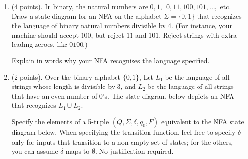 \documentclass[letterpaper,11pt,twoside]{article}
\theoremstyle{plain}
\theoremstyle{definition}
\theoremstyle{remark}
\theoremstyle{restate}
\begin{document}
\begin{enumerate}
    \item (4 points). 
    In binary, the natural numbers are $0, 1, 10, 11, 100, 101, ..., $ etc. Draw a state diagram for an NFA on the alphabet $\Sigma = \{0, 1\}$ that recognizes the language of binary natural numbers divisible by 4. (For instance, your machine should accept $100$, but reject $11$ and $101$. Reject strings with extra leading zeroes, like $0100$.)
    
    Explain in words why your NFA recognizes the language specified.
    
    \item (2 points). 
    Over the binary alphabet $\{0,1\}$, Let $L_1$ be the language of all strings whose length is divisible by 3, and $L_2$ be the language of all strings that have an even number of $0$'s. The state diagram below depicts an NFA that recognizes $L_1 \cup L_2$.

    Specify the elements of a 5-tuple $(Q, \Sigma, \delta, q_0, F)$ equivalent to the NFA state diagram below. When specifying the transition function, feel free to specify $\delta$ only for inputs that transition to a non-empty set of states; for the others, you can assume $\delta$ maps to $\emptyset$. No justification required.


\end{enumerate}
\end{document}
